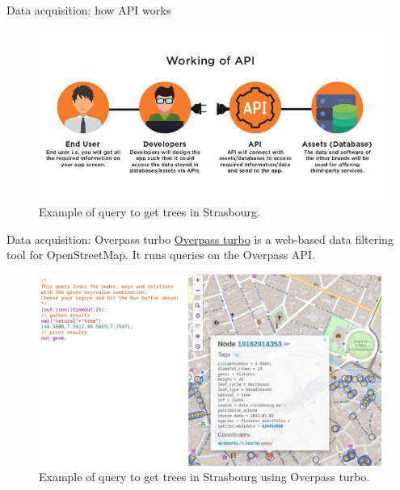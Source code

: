\documentclass[10pt]{beamer}
\begin{document}
\begin{frame}{Data acquisition: how API works}
  \begin{figure}[H]
    \centering
    \includegraphics[width=1\textwidth]{images/how-api-works.jpg}
    \caption{Example of query to get trees in Strasbourg.}
  \end{figure}
\end{frame}

\begin{frame}{Data acquisition: Overpass turbo}
\href{https://overpass-turbo.eu/}{Overpass turbo}
 is a web-based data filtering tool for OpenStreetMap. 
It runs queries on the Overpass API.

  \begin{figure}[H]
    \centering
    \includegraphics[width=1\textwidth]{images/overpass_turbo.png}
    \caption{Example of query to get trees in Strasbourg using Overpass turbo.}
  \end{figure}
\end{frame}
\end{document}
